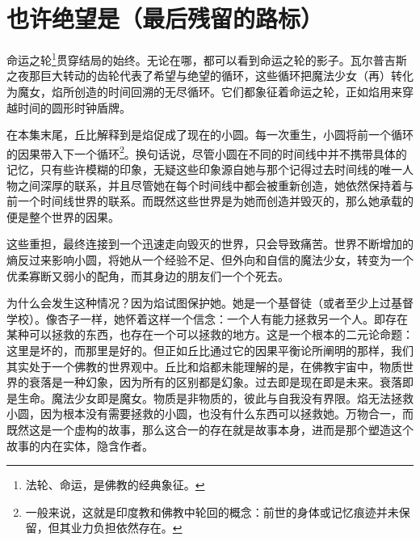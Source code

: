 \chapter[也许绝望是（最后残留的路标）]{也许绝望是\protect\footnotemark（最后残留的路标）}


命运之轮\footnote{法轮、命运，是佛教的经典象征。}\cite{ref62}贯穿结局的始终。无论在哪，都可以看到命运之轮的影子。瓦尔普吉斯之夜那巨大转动的齿轮代表了希望与绝望的循环，这些循环把魔法少女（再）转化为魔女，焰所创造的时间回溯的无尽循环。它们都象征着命运之轮，正如焰用来穿越时间的圆形时钟盾牌。

在本集末尾，丘比解释到是焰促成了现在的小圆。每一次重生，小圆将前一个循环的因果带入下一个循环\footnote{一般来说，这就是印度教和佛教中轮回的概念：前世的身体或记忆痕迹并未保留，但其业力负担依然存在。}\cite{ref65}。换句话说，尽管小圆在不同的时间线中并不携带具体的记忆，只有些许模糊的印象，无疑这些印象源自她与那个记得过去时间线的唯一人物之间深厚的联系，并且尽管她在每个时间线中都会被重新创造，她依然保持着与前一个时间线世界的联系。而既然这些世界是为她而创造并毁灭的，那么她承载的便是整个世界的因果。

这些重担，最终连接到一个迅速走向毁灭的世界，只会导致痛苦\cite{ref62}。世界不断增加的熵反过来影响小圆，将她从一个经验不足、但外向和自信的魔法少女，转变为一个优柔寡断又弱小的配角，而其身边的朋友们一个个死去。

为什么会发生这种情况？因为焰试图保护她。她是一个基督徒（或者至少上过基督学校）。像杏子一样，她怀着这样一个信念：一个人有能力拯救另一个人。即存在某种可以拯救的东西，也存在一个可以拯救的地方。这是一个根本的二元论命题：这里是坏的，而那里是好的。但正如丘比通过它的因果平衡论所阐明的那样，我们其实处于一个佛教的世界观中。丘比和焰都未能理解的是，在佛教宇宙中，物质世界的衰落是一种幻象，因为所有的区别都是幻象\cite{ref63}。过去即是现在即是未来。衰落即是生命。魔法少女即是魔女。物质是非物质的，彼此与自我没有界限。焰无法拯救小圆，因为根本没有需要拯救的小圆，也没有什么东西可以拯救她。万物合一，而既然这是一个虚构的故事，那么这合一的存在就是故事本身，进而是那个塑造这个故事的内在实体，隐含作者。

